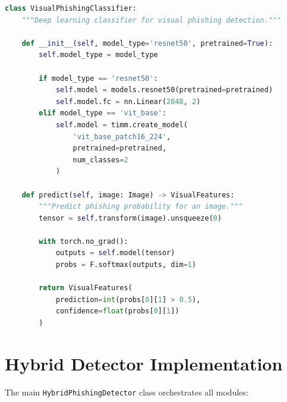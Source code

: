 \documentclass[12pt,a4paper]{report}
\begin{document}
\begin{lstlisting}[language=Python, caption=Visual Model Architecture]
class VisualPhishingClassifier:
    """Deep learning classifier for visual phishing detection."""
    
    def __init__(self, model_type='resnet50', pretrained=True):
        self.model_type = model_type
        
        if model_type == 'resnet50':
            self.model = models.resnet50(pretrained=pretrained)
            self.model.fc = nn.Linear(2048, 2)
        elif model_type == 'vit_base':
            self.model = timm.create_model(
                'vit_base_patch16_224',
                pretrained=pretrained,
                num_classes=2
            )
    
    def predict(self, image: Image) -> VisualFeatures:
        """Predict phishing probability for an image."""
        tensor = self.transform(image).unsqueeze(0)
        
        with torch.no_grad():
            outputs = self.model(tensor)
            probs = F.softmax(outputs, dim=1)
            
        return VisualFeatures(
            prediction=int(probs[0][1] > 0.5),
            confidence=float(probs[0][1])
        )
\end{lstlisting}

\section{Hybrid Detector Implementation}

The main \texttt{HybridPhishingDetector} class orchestrates all modules:
\end{document}
